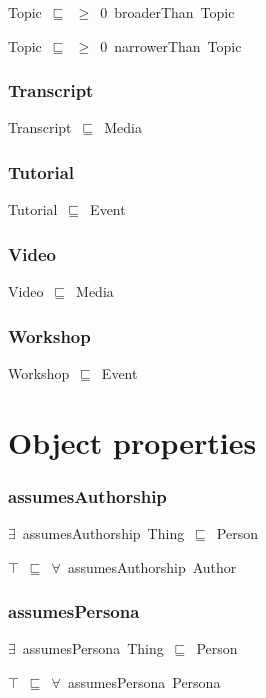 \documentclass{article}
\begin{document}
Topic~\ensuremath{\sqsubseteq}~\ensuremath{\geq}~0~broaderThan~Topic~

Topic~\ensuremath{\sqsubseteq}~\ensuremath{\geq}~0~narrowerThan~Topic~

\subsubsection*{Transcript}

Transcript~\ensuremath{\sqsubseteq}~Media~

\subsubsection*{Tutorial}

Tutorial~\ensuremath{\sqsubseteq}~Event~

\subsubsection*{Video}

Video~\ensuremath{\sqsubseteq}~Media~

\subsubsection*{Workshop}

Workshop~\ensuremath{\sqsubseteq}~Event~

\section*{Object properties}\subsubsection*{assumesAuthorship}

\ensuremath{\exists}~assumesAuthorship~Thing~\ensuremath{\sqsubseteq}~Person

\ensuremath{\top}~\ensuremath{\sqsubseteq}~\ensuremath{\forall}~assumesAuthorship~Author

\subsubsection*{assumesPersona}

\ensuremath{\exists}~assumesPersona~Thing~\ensuremath{\sqsubseteq}~Person

\ensuremath{\top}~\ensuremath{\sqsubseteq}~\ensuremath{\forall}~assumesPersona~Persona
\end{document}
